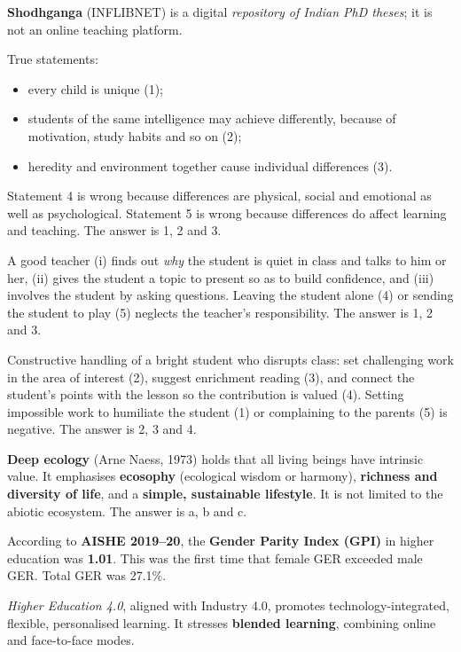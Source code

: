 \textbf{Shodhganga} (INFLIBNET) is a digital \emph{repository of Indian PhD theses}; it is not an online teaching platform.

True statements:
\begin{itemize}
\item every child is unique (1);
\item students of the same intelligence may achieve differently, because of motivation, study habits and so on (2);
\item heredity and environment together cause individual differences (3).
\end{itemize}
Statement 4 is wrong because differences are physical, social and emotional as well as psychological. Statement 5 is wrong because differences do affect learning and teaching. The answer is 1, 2 and 3.

A good teacher (i) finds out \emph{why} the student is quiet in class and talks to him or her, (ii) gives the student a topic to present so as to build confidence, and (iii) involves the student by asking questions. Leaving the student alone (4) or sending the student to play (5) neglects the teacher's responsibility. The answer is 1, 2 and 3.

Constructive handling of a bright student who disrupts class: set challenging work in the area of interest (2), suggest enrichment reading (3), and connect the student's points with the lesson so the contribution is valued (4).
Setting impossible work to humiliate the student (1) or complaining to the parents (5) is negative. The answer is 2, 3 and 4.

\textbf{Deep ecology} (Arne Naess, 1973) holds that all living beings have intrinsic value. It emphasises \textbf{ecosophy} (ecological wisdom or harmony), \textbf{richness and diversity of life}, and a \textbf{simple, sustainable lifestyle}. It is not limited to the abiotic ecosystem. The answer is a, b and c.

According to \textbf{AISHE 2019--20}, the \textbf{Gender Parity Index (GPI)} in higher education was \textbf{1.01}. This was the first time that female GER exceeded male GER. Total GER was 27.1\%.

\emph{Higher Education 4.0}, aligned with Industry 4.0, promotes technology-integrated, flexible, personalised learning. It stresses \textbf{blended learning}, combining online and face-to-face modes.

